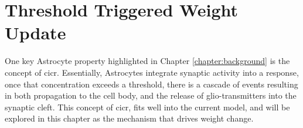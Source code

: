 

\section{\ca Threshold Triggered Weight Update}
One key Astrocyte property highlighted in Chapter \ref{chapter:background} is
the concept of \Gls{cicr}. Essentially, Astrocytes integrate synaptic activity into a
\ca response, once that \ca concentration exceeds a threshold, there is a
cascade of events resulting in both \ca propagation to the cell body, and the
release of glio-transmitters into the synaptic cleft. This concept of \Gls{cicr}, fits
well into the current model, and will be explored in this chapter as the
mechanism that drives weight change.

